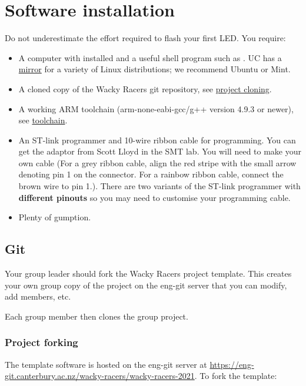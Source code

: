 \label{software}
\chapter{Software installation}


Do not underestimate the effort required to flash your first LED. You
require:

\begin{itemize}
\item
  A computer with  installed and a useful shell program such as
  . UC has a \href{http://ucmirror.canterbury.ac.nz/}{mirror}
  for a variety of Linux distributions; we recommend Ubuntu or Mint.

\item A cloned copy of the Wacky Racers git repository, see \hyperref[project-cloning]{project cloning}.

\item
  A working ARM toolchain (arm-none-eabi-gcc/g++ version 4.9.3 or newer), see \hyperref[toolchain]{toolchain}.

\item
  An ST-link programmer and 10-wire ribbon cable for programming. You
  can get the adaptor from Scott Lloyd in the SMT lab. You will need
  to make your own cable (For a grey ribbon cable, align the red
  stripe with the small arrow denoting pin 1 on the connector. For a
  rainbow ribbon cable, connect the brown wire to pin 1.). There are
  two variants of the ST-link programmer with \textbf{different
  pinouts} so you may need to customise your programming cable.
\item
  Plenty of gumption.
\end{itemize}


\section{Git}

Your group leader should fork the Wacky Racers project template.  This
creates your own group copy of the project on the eng-git server that
you can modify, add members, etc.

Each group member then clones the group project.


\subsection{Project forking}
\label{project-forking}

The template software is hosted on the eng-git  server at
\href{https://eng-git.canterbury.ac.nz/wacky-racers/wacky-racers-2021}{\url{https://eng-git.canterbury.ac.nz/wacky-racers/wacky-racers-2021}}.
To fork the template:

